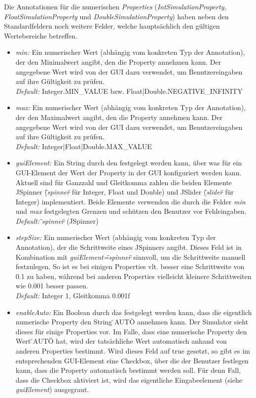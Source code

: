 \documentclass[a4paper, 11pt]{article} %
\begin{document}
Die Annotationen für die numerischen \emph{Properties} (\emph{IntSimulationProperty}, \emph{FloatSimulationProperty} und \emph{DoubleSimulationProperty}) haben neben den Standardfeldern noch weitere Felder, welche hauptsächlich den gültigen Wertebereiche betreffen.
\begin{itemize}
	\item \emph{min:} Ein numerischer Wert (abhängig vom konkreten Typ der Annotation), der den Minimalwert angibt, den die Property annehmen kann. Der angegebene Wert wird von der GUI dazu verwendet, um Benutzereingaben auf ihre Gültigkeit zu prüfen.\\
	\emph{Default:} Integer.MIN\_VALUE bzw. Float|Double.NEGATIVE\_INFINITY
	\item \emph{max:} Ein numerischer Wert (abhängig vom konkreten Typ der Annotation), der den Maximalwert angibt, den die Property annehmen kann. Der angegebene Wert wird von der GUI dazu verwendet, um Benutzereingaben auf ihre Gültigkeit zu prüfen.\\
	\emph{Default:} Integer|Float|Double.MAX\_VALUE
	\item \emph{guiElement:} Ein String durch den festgelegt werden kann, über was für ein GUI-Element der Wert der Property in der GUI konfiguriert werden kann. Aktuell sind für Ganzzahl und Gleitkomma zahlen die beiden Elemente JSpinner (\emph{\"{}spinner\"{}} für Integer, Float und Double) und JSlider (\emph{\"{}slider\"{}} für Integer) implementiert. Beide Elemente verwenden die durch die Felder \emph{min} und \emph{max} festgelegten Grenzen und schützen den Benutzer vor Fehleingaben.\\
	\emph{Default:} \emph{\"{}spinner\"{}} (JSpinner)
	\item \emph{stepSize:} Ein numerischer Wert (abhängig vom konkreten Typ der Annotation), der die Schrittweite eines JSpinners angibt. Dieses Feld ist in Kombination mit \emph{guiElement=\"{}spinner\"{}} sinnvoll, um die Schrittweite manuell festzulegen. So ist es bei einigen Properties vlt. besser eine Schrittweite von 0.1 zu haben, während bei anderen Properties vielleicht kleinere Schrittweiten wie 0.001 besser passen.\\
	\emph{Default:} Integer 1, Gleitkomma 0.001f
	\item \emph{enableAuto:} Ein Boolean durch das festgelegt werden kann, dass die eigentlich numerische Property den String \"{}AUTO\"{} annehmen kann. Der Simulator sieht dieses für einige Properties vor. Im Falle, dass eine numerische Property den Wert \"{}AUTO\"{} hat, wird der tatsächliche Wert automatisch anhand von anderen Properties bestimmt. Wird dieses Feld auf true gesetzt, so gibt es im entsprechenden GUI-Element eine Checkbox, über die der Benutzer festlegen kann, dass die Property automatisch bestimmt werden soll. Für denn Fall, dass  die Checkbox aktiviert ist, wird das eigentliche Eingabeelement (siehe \emph{guiElement}) ausgegraut.\\

\end{itemize}
\end{document}
